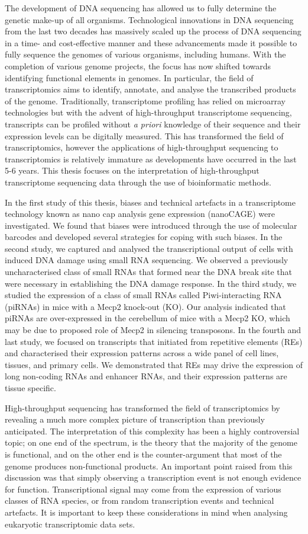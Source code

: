 The development of DNA sequencing has allowed us to fully determine the genetic make-up of all organisms. Technological innovations in DNA sequencing from the last two decades has massively scaled up the process of DNA sequencing in a time- and cost-effective manner and these advancements made it possible to fully sequence the genomes of various organisms, including humans. With the completion of various genome projects, the focus has now shifted towards identifying functional elements in genomes. In particular, the field of transcriptomics aims to identify, annotate, and analyse the transcribed products of the genome. Traditionally, transcriptome profiling has relied on microarray technologies but with the advent of high-throughput transcriptome sequencing, transcripts can be profiled without \textit{a priori} knowledge of their sequence and their expression levels can be digitally measured. This has transformed the field of transcriptomics, however the applications of high-throughput sequencing to transcriptomics is relatively immature as developments have occurred in the last 5-6 years. This thesis focuses on the interpretation of high-throughput transcriptome sequencing data through the use of bioinformatic methods.

In the first study of this thesis, biases and technical artefacts in a transcriptome technology known as nano cap analysis gene expression (nanoCAGE) were investigated. We found that biases were introduced through the use of molecular barcodes and developed several strategies for coping with such biases. In the second study, we captured and analysed the transcriptional output of cells with induced DNA damage using small RNA sequencing. We observed a previously uncharacterised class of small RNAs that formed near the DNA break site that were necessary in establishing the DNA damage response. In the third study, we studied the expression of a class of small RNAs called Piwi-interacting RNA (piRNAs) in mice with a Mecp2 knock-out (KO). Our analysis indicated that piRNAs are over-expressed in the cerebellum of mice with a Mecp2 KO, which may be due to proposed role of Mecp2 in silencing transposons. In the fourth and last study, we focused on transcripts that initiated from repetitive elements (REs) and characterised their expression patterns across a wide panel of cell lines, tissues, and primary cells. We demonstrated that REs may drive the expression of long non-coding RNAs and enhancer RNAs, and their expression patterns are tissue specific.

High-throughput sequencing has transformed the field of transcriptomics by revealing a much more complex picture of transcription than previously anticipated. The interpretation of this complexity has been a highly controversial topic; on one end of the spectrum, is the theory that the majority of the genome is functional, and on the other end is the counter-argument that most of the genome produces non-functional products. An important point raised from this discussion was that simply observing a transcription event is not enough evidence for function. Transcriptional signal may come from the expression of various classes of RNA species, or from random transcription events and technical artefacts. It is important to keep these considerations in mind when analysing eukaryotic transcriptomic data sets.
